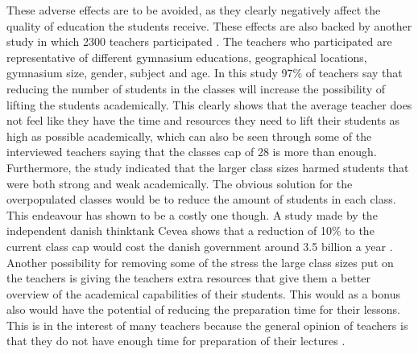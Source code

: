 \noindent
These adverse effects are to be avoided, as they clearly negatively affect the quality of education the students receive. These effects are also backed by another study in which 2300 teachers participated \cite{KlassestrrelsersGymnasiet}. The teachers who participated are representative of different gymnasium educations, geographical locations, gymnasium size, gender, subject and age. In this study 97\% of teachers say that reducing the number of students in the classes will increase the possibility of lifting the students academically. This clearly shows that the average teacher does not feel like they have the time and resources they need to lift their students as high as possible academically, which can also be seen through some of the interviewed teachers saying that the classes cap of 28 is more than enough.
\newline\indent
Furthermore, the study indicated that the larger class sizes harmed students that were both strong and weak academically. The obvious solution for the overpopulated classes would be to reduce the amount of students in each class. This endeavour has shown to be a costly one though. A study made by the independent danish thinktank Cevea shows that a reduction of 10\% to the current class cap would cost the danish government around 3.5 billion a year \cite{Cevea2013UtilsigtedeLsninger}. Another possibility for removing some of the stress the large class sizes put on the teachers is giving the teachers extra resources that give them a better overview of the academical capabilities of their students. This would as a bonus also would have the potential of reducing the preparation time for their lessons. This is in the interest of many teachers because the general opinion of teachers is that they do not have enough time for preparation of their lectures \cite{AntoniLund2017KortUdfordring}. 